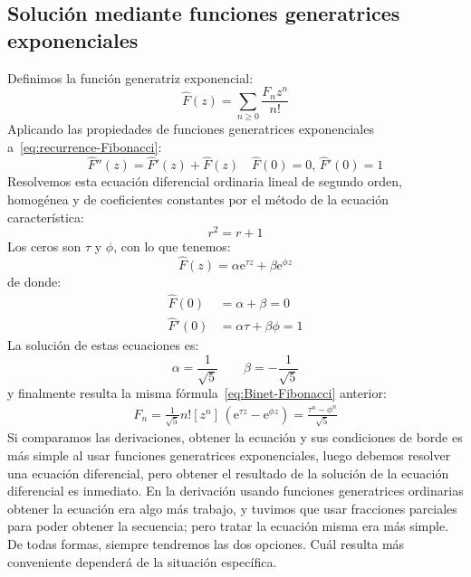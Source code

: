 \subsection{Solución mediante funciones generatrices exponenciales}
\label{sec:Fibonacci-exponenciales}

  Definimos la función generatriz exponencial:
  \begin{equation*}
    \widehat{F}(z)
      = \sum_{n \ge 0} \frac{F_n z^n}{n!}
  \end{equation*}
  Aplicando las propiedades de funciones generatrices exponenciales%
  a~\eqref{eq:recurrence-Fibonacci}:
  \begin{equation*}
    \widehat{F}''(z)
      = \widehat{F}'(z) + \widehat{F}(z)
      \quad \text{\(\widehat{F}(0) = 0\), \(\widehat{F}'(0) = 1\)}
  \end{equation*}
  Resolvemos esta ecuación diferencial
  ordinaria lineal de segundo orden,
  homogénea y de coeficientes constantes
  por el método de la ecuación característica:
  \begin{equation*}
    r^2
      = r + 1
  \end{equation*}
  Los ceros son
  \(\tau\) y \(\phi\),
  con lo que tenemos:
  \begin{equation*}
    \widehat{F}(z)
      = \alpha \mathrm{e}^{\tau z} + \beta \mathrm{e}^{\phi z}
  \end{equation*}
  de donde:
  \begin{align*}
    \widehat{F}(0)  &= \alpha + \beta = 0 \\
    \widehat{F}'(0) &= \alpha \tau + \beta \phi = 1
  \end{align*}
  La solución de estas ecuaciones es:
  \begin{equation*}
    \alpha
      = \frac{1}{\sqrt{5}} \qquad
    \beta
      = -\frac{1}{\sqrt{5}}
  \end{equation*}
  y finalmente resulta
  la misma fórmula~\eqref{eq:Binet-Fibonacci} anterior:
  \begin{align*}
    F_n
      = \frac{1}{\sqrt{5}}
	  n! \left[ z^n \right] \,
	    \left(
	      \mathrm{e}^{\tau z} - \mathrm{e}^{\phi z}
	    \right)
      = \frac{\tau^n - \phi^n}{\sqrt{5}}
  \end{align*}
  Si comparamos las derivaciones,
  obtener la ecuación y sus condiciones de borde es más simple
  al usar funciones generatrices exponenciales,
  luego debemos resolver una ecuación diferencial,
  pero obtener el resultado
  de la solución de la ecuación diferencial es inmediato.
  En la derivación usando funciones generatrices ordinarias
  obtener la ecuación era algo más trabajo,
  y tuvimos que usar fracciones parciales
  para poder obtener la secuencia;
  pero tratar la ecuación misma era más simple.
  De todas formas,
  siempre tendremos las dos opciones.
  Cuál resulta más conveniente dependerá de la situación específica.


